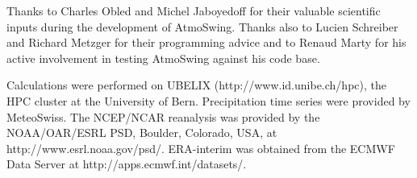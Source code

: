 \documentclass[gmd]{copernicus}
\begin{document}














\begin{acknowledgements}
Thanks to Charles Obled and Michel Jaboyedoff for their valuable scientific inputs during the development of AtmoSwing. Thanks also to Lucien Schreiber and Richard Metzger for their programming advice and to Renaud Marty for his active involvement in testing AtmoSwing against his code base.  

Calculations were performed on UBELIX (http://www.id.unibe.ch/hpc), the HPC cluster at the University of Bern. Precipitation time series were provided by MeteoSwiss. The NCEP/NCAR reanalysis was provided by the NOAA/OAR/ESRL PSD, Boulder, Colorado, USA, at http://www.esrl.noaa.gov/psd/. ERA-interim was obtained from the ECMWF Data Server at http://apps.ecmwf.int/datasets/. 
\end{acknowledgements}
\end{document}
